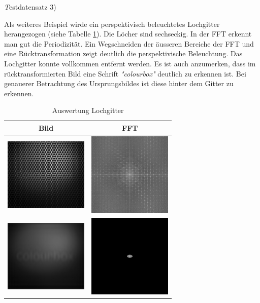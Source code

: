 \documentclass[12pt,german]{article}
\begin{document}
\textit Testdatensatz 3)

Als weiteres Beispiel wirde ein perspektivisch beleuchtetes Lochgitter herangezogen (siehe Tabelle \ref{tab:AuswertungLochgitter}). Die Löcher sind sechseckig. In der FFT erkennt man gut die Periodizität. Ein Wegschneiden der äusseren Bereiche der FFT und eine Rücktransformation zeigt deutlich die perspektivische Beleuchtung. Das Lochgitter konnte vollkommen entfernt werden. Es ist auch anzumerken, dass im rücktransformierten Bild eine Schrift \textit{"colourbox"} deutlich zu erkennen ist. Bei genauerer Betrachtung des Ursprungsbildes ist diese hinter dem Gitter zu erkennen.  
\begin{table}[H]
  \centering
  \begin{tabular}{c | c}
    \hline
    Bild & FFT \\
    \hline
	\includegraphics[width=4cm]{../testData/Lochgitter.jpg} & \includegraphics[width=4cm]{../testData/Results/Lochgitter/FFT_of_Lochgitter.jpg} \\
    \hline
    \includegraphics[width=4cm]{../testData/Results/Lochgitter/reducedLochgitter.jpg} & \includegraphics[width=4cm]{../testData/Results/Lochgitter/reducedFFT_of_Lochgitter.jpg} \\
  \end{tabular}
  \caption{Auswertung Lochgitter}
  \label{tab:AuswertungLochgitter}
\end{table}
\end{document}
